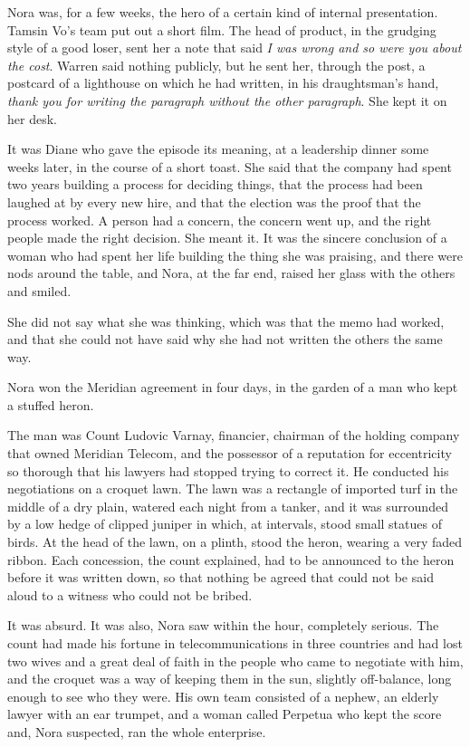 Nora was, for a few weeks, the hero of a certain kind of internal presentation. Tamsin Vo's team put out a short film. The head of product, in the grudging style of a good loser, sent her a note that said \emph{I was wrong and so were you about the cost}. Warren said nothing publicly, but he sent her, through the post, a postcard of a lighthouse on which he had written, in his draughtsman's hand, \emph{thank you for writing the paragraph without the other paragraph}. She kept it on her desk.

It was Diane who gave the episode its meaning, at a leadership dinner some weeks later, in the course of a short toast. She said that the company had spent two years building a process for deciding things, that the process had been laughed at by every new hire, and that the election was the proof that the process worked. A person had a concern, the concern went up, and the right people made the right decision. She meant it. It was the sincere conclusion of a woman who had spent her life building the thing she was praising, and there were nods around the table, and Nora, at the far end, raised her glass with the others and smiled.

She did not say what she was thinking, which was that the memo had worked, and that she could not have said why she had not written the others the same way.

\scenebreak
\noindent Nora won the Meridian agreement in four days, in the garden of a man who kept a stuffed heron.

The man was Count Ludovic Varnay, financier, chairman of the holding company that owned Meridian Telecom, and the possessor of a reputation for eccentricity so thorough that his lawyers had stopped trying to correct it. He conducted his negotiations on a croquet lawn. The lawn was a rectangle of imported turf in the middle of a dry plain, watered each night from a tanker, and it was surrounded by a low hedge of clipped juniper in which, at intervals, stood small statues of birds. At the head of the lawn, on a plinth, stood the heron, wearing a very faded ribbon. Each concession, the count explained, had to be announced to the heron before it was written down, so that nothing be agreed that could not be said aloud to a witness who could not be bribed.

It was absurd. It was also, Nora saw within the hour, completely serious. The count had made his fortune in telecommunications in three countries and had lost two wives and a great deal of faith in the people who came to negotiate with him, and the croquet was a way of keeping them in the sun, slightly off-balance, long enough to see who they were. His own team consisted of a nephew, an elderly lawyer with an ear trumpet, and a woman called Perpetua who kept the score and, Nora suspected, ran the whole enterprise.

